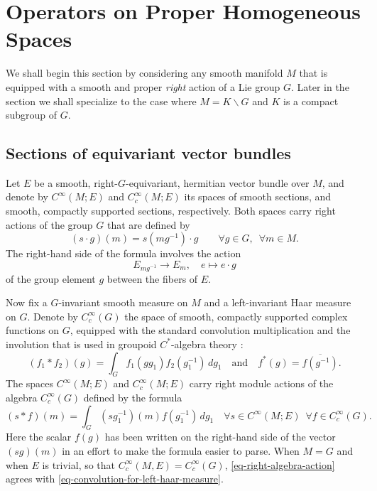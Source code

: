 \documentclass[leqno,11pt]{amsart}
\numberwithin{equation}{subsection}
\theoremstyle{plain}
\theoremstyle{definition}
\theoremstyle{remark}
\begin{document}
\section{Operators on Proper Homogeneous Spaces}

We shall begin this section by considering    any smooth manifold  $M$ that is equipped with a smooth and  proper   \emph{right} action of a Lie group $G$.    Later in the section we shall specialize to the case where $M=K \backslash G $ and  $K$ is a  compact subgroup of $G$. 

\subsection{Sections of equivariant vector bundles}
Let $E$   be a  smooth, right-$G$-equi\-variant, hermitian vector bundle over $M$, and denote by $C^\infty (M;E)$ and $C_c^\infty (M;E)$ its spaces of smooth  sections, and smooth, compactly supported sections, respectively.  Both spaces carry right actions of the group $G$ that are defined by 
\[
(s \cdot g) (m) =   s(mg^{-1})\cdot g \qquad \forall g \in G,\,\,\, \forall m \in M .
\]
The right-hand side of the formula involves the  action 
\[
E_{mg^{-1}} \to E_m, \quad e\mapsto e \cdot g
\]
of the group element $g$ between the fibers of $E$.

Now fix a $G$-invariant smooth measure on $M$ and a {left}-invariant Haar measure on $G$.   Denote by $C_c^\infty (G)$ the space of smooth, compactly supported complex functions on $G$, equipped with the standard   convolution multiplication and the involution that is used in groupoid $C^*$-algebra theory \cite[Sec.\,II.1]{RenaultGroupoidApproach80}:
\begin{equation}
\label{eq-convolution-for-left-haar-measure}
(f_1*f_2)(g) = \int _G f_1(gg_1)f_2(g_1^{-1} ) \, dg_1\quad\text{and}\quad 
f^*(g) = \overline{f(g^{-1})}  .
\end{equation}
The spaces  $C^\infty (M;E)$ and $C_c^\infty (M;E)$ carry right module actions of the algebra $C_c^\infty (G)$ defined by the formula 
\begin{equation}
    \label{eq-right-algebra-action}
(s* f) (m) = \int _G  ( sg_1^{-1}) (m) f(g_1^{-1}) \, dg_1 \quad 
\forall s \in C^\infty (M;E)\,\,\,\forall f \in C_c^\infty (G) .
\end{equation}
Here the scalar $f(g)$ has been written on the right-hand side of the vector $(sg)(m)$ in an effort to make the formula easier to parse.  When $M{=}G$ and when $E$ is trivial, so that $C_c^\infty(M,E) = C_c^\infty(G)$, \eqref{eq-right-algebra-action} agrees with \eqref{eq-convolution-for-left-haar-measure}.
\end{document}
